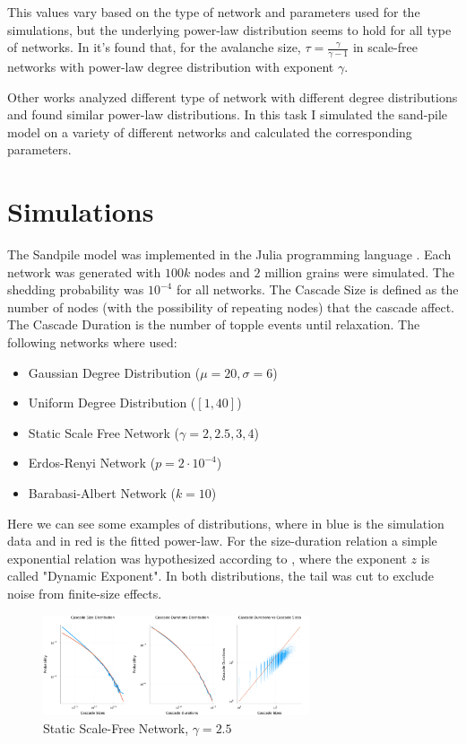 This values vary based on the type of network and parameters used for the simulations, but the underlying power-law distribution seems to hold for all type of networks.
In \cite{scale_free_sandpile} it's found that, for the avalanche size, $\tau = \frac{\gamma}{\gamma -1}$ in scale-free networks with power-law degree distribution with exponent $\gamma$.

Other works \cite{random_graph_sandpile} analyzed different type of network with different degree distributions and found similar power-law distributions.
In this task I simulated the sand-pile model on a variety of different networks and calculated the corresponding parameters.

\section{Simulations}

The Sandpile model was implemented in the Julia programming language \cite{julia}. Each network was generated with $100k$ nodes and $2$ million grains were simulated. The shedding probability was $10^{-4}$ for all networks. The Cascade Size is defined as the number of nodes (with the possibility of repeating nodes) that the cascade affect. The Cascade Duration is the number of topple events until relaxation.
The following networks where used:
\begin{itemize}
    \item Gaussian Degree Distribution ($\mu = 20, \sigma = 6$)
    \item Uniform Degree Distribution ($[1,40]$)
    \item Static Scale Free Network ($\gamma = 2, 2.5, 3, 4$) \cite{scale_free_generation}
    \item Erdos-Renyi Network ($p = 2\cdot 10^{-4}$)
    \item Barabasi-Albert Network ($k = 10$)
\end{itemize}

Here we can see some examples of distributions, where in blue is the simulation data and in red is the fitted power-law. For the size-duration relation a simple exponential relation was hypothesized according to \cite{scale_free_sandpile}, where the exponent $z$ is called "Dynamic Exponent".
In both distributions, the tail was cut to exclude noise from finite-size effects.
    \begin{figure}[H]
        \centering
        \includegraphics[width=0.7\textwidth]{images/Task15/StaticScaleFree25.png}
        \caption{Static Scale-Free Network, $\gamma = 2.5$}
    \end{figure}
    

